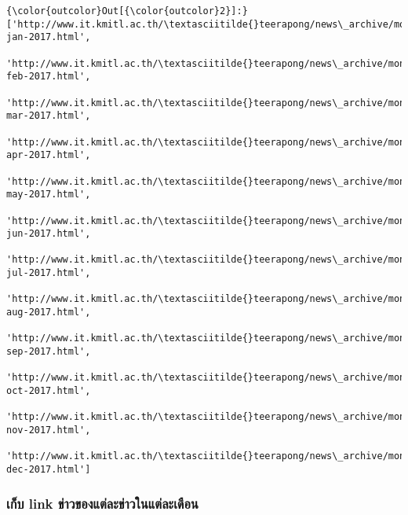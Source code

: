 \documentclass[11pt]{article}
\begin{document}
\begin{Verbatim}[commandchars=\\\{\}]
{\color{outcolor}Out[{\color{outcolor}2}]:} ['http://www.it.kmitl.ac.th/\textasciitilde{}teerapong/news\_archive/month-jan-2017.html',
         'http://www.it.kmitl.ac.th/\textasciitilde{}teerapong/news\_archive/month-feb-2017.html',
         'http://www.it.kmitl.ac.th/\textasciitilde{}teerapong/news\_archive/month-mar-2017.html',
         'http://www.it.kmitl.ac.th/\textasciitilde{}teerapong/news\_archive/month-apr-2017.html',
         'http://www.it.kmitl.ac.th/\textasciitilde{}teerapong/news\_archive/month-may-2017.html',
         'http://www.it.kmitl.ac.th/\textasciitilde{}teerapong/news\_archive/month-jun-2017.html',
         'http://www.it.kmitl.ac.th/\textasciitilde{}teerapong/news\_archive/month-jul-2017.html',
         'http://www.it.kmitl.ac.th/\textasciitilde{}teerapong/news\_archive/month-aug-2017.html',
         'http://www.it.kmitl.ac.th/\textasciitilde{}teerapong/news\_archive/month-sep-2017.html',
         'http://www.it.kmitl.ac.th/\textasciitilde{}teerapong/news\_archive/month-oct-2017.html',
         'http://www.it.kmitl.ac.th/\textasciitilde{}teerapong/news\_archive/month-nov-2017.html',
         'http://www.it.kmitl.ac.th/\textasciitilde{}teerapong/news\_archive/month-dec-2017.html']
\end{Verbatim}
            
    \subsubsection{เก็บ link
ข่าวของแต่ละข่าวในแต่ละเดือน}\label{uxe40uxe01uxe1a-link-uxe02uxe32uxe27uxe02uxe2duxe07uxe41uxe15uxe25uxe30uxe02uxe32uxe27uxe43uxe19uxe41uxe15uxe25uxe30uxe40uxe14uxe2duxe19}
\end{document}
